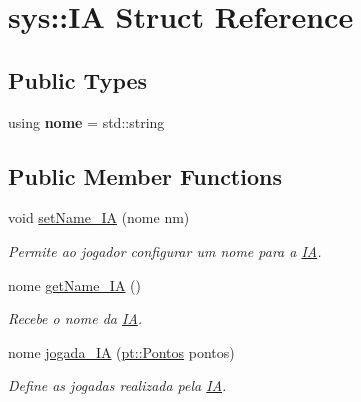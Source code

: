 \hypertarget{structsys_1_1IA}{}\section{sys\+:\+:IA Struct Reference}
\label{structsys_1_1IA}
\subsection*{Public Types}
\begin{DoxyCompactItemize}
\item 
\mbox{\label{structsys_1_1IA_ab1638b84aee41c09f2e35aab79a7cb72}} 
using {\bfseries nome} = std\+::string
\end{DoxyCompactItemize}
\subsection*{Public Member Functions}
\begin{DoxyCompactItemize}
\item 
\mbox{\label{structsys_1_1IA_a97960b9eec1b484967f7fbbbfe79f84a}} 
void \hyperlink{structsys_1_1IA_a97960b9eec1b484967f7fbbbfe79f84a}{set\+Name\+\_\+\+IA} (nome nm)
\begin{DoxyCompactList}\small\item\em Permite ao jogador configurar um nome para a \hyperlink{structsys_1_1IA}{IA}. \end{DoxyCompactList}\item 
\mbox{\label{structsys_1_1IA_aab2a239eabbbf19c5ce0dbc2ea117fda}} 
nome \hyperlink{structsys_1_1IA_aab2a239eabbbf19c5ce0dbc2ea117fda}{get\+Name\+\_\+\+IA} ()
\begin{DoxyCompactList}\small\item\em Recebe o nome da \hyperlink{structsys_1_1IA}{IA}. \end{DoxyCompactList}\item 
nome \hyperlink{structsys_1_1IA_af66b1ac3ef1fe1772893a389e26e9cdc}{jogada\+\_\+\+IA} (\hyperlink{structpt_1_1Pontos}{pt\+::\+Pontos} pontos)
\begin{DoxyCompactList}\small\item\em Define as jogadas realizada pela \hyperlink{structsys_1_1IA}{IA}. \end{DoxyCompactList}\end{DoxyCompactItemize}
